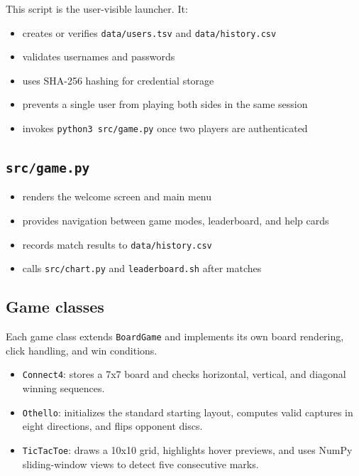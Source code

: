 \documentclass[12pt,a4paper]{article}
\begin{document}
This script is the user-visible launcher. It:

\begin{itemize}
    \item creates or verifies \texttt{data/users.tsv} and \texttt{data/history.csv}
    \item validates usernames and passwords
    \item uses SHA-256 hashing for credential storage
    \item prevents a single user from playing both sides in the same session
    \item invokes \texttt{python3 src/game.py} once two players are authenticated
\end{itemize}

\subsection{\texttt{src/game.py}}

\begin{itemize}
    \item renders the welcome screen and main menu
    \item provides navigation between game modes, leaderboard, and help cards
    \item records match results to \texttt{data/history.csv}
    \item calls \texttt{src/chart.py} and \texttt{leaderboard.sh} after matches
\end{itemize}

\subsection{Game classes}

Each game class extends \texttt{BoardGame} and implements its own board rendering, click handling, and win conditions.

\begin{itemize}
    \item \texttt{Connect4}: stores a 7x7 board and checks horizontal, vertical, and diagonal winning sequences.
    \item \texttt{Othello}: initializes the standard starting layout, computes valid captures in eight directions, and flips opponent discs.
    \item \texttt{TicTacToe}: draws a 10x10 grid, highlights hover previews, and uses NumPy sliding-window views to detect five consecutive marks.
\end{itemize}
\end{document}

